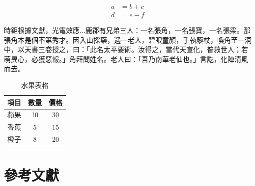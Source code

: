 \documentclass[12pt]{article}
\begin{document}
\begin{align}
    a &= b + c \label{eq:1}
    \\
    d &= e - f \label{eq:2}
\end{align}
    
時鉅根據文獻\cite{einstein1905}，光電\cite{latexcompanion}效\cite{鄭智銘2006分散式儲存架構下的遠距環境監測系統之建構}應...鹿郡有兄弟三人：一名張角，一名張寶，一名張梁。那張角本是個不第秀才。因入山採藥，遇一老人，碧眼童顏，手執藜杖，喚角至一洞中，以天書三卷授之，曰：「此名太平要術。汝得之，當代天宣化，普救世人；若萌異心，必獲惡報。」角拜問姓名。老人曰：「吾乃南華老仙也。」言訖，化陣清風而去。

\begin{table}[ht]
    \centering
    \begin{tabular}{|c|c|c|}
    \hline
    項目  & 數量 & 價格 \\
    \hline
    蘋果  & 10  & 30   \\
    香蕉  & 5   & 15   \\
    橙子  & 8   & 20   \\
    \hline
    \end{tabular}
    \caption{水果表格}
    \label{tab:fruits}
\end{table}
\section{參考文獻}
\vspace{-3.5em}  %
\renewcommand{\refname}{}  %
\printbibliography  %
\end{document}

